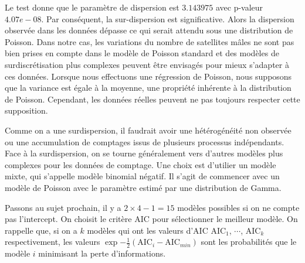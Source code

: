 \documentclass[../main.tex]{subfiles}
\begin{document}
\begin{CJK*}{UTF8}{gbsn}
Le test donne que le paramètre de dispersion est $3.143975$ avec p-valeur $4.07e-08$.
Par conséquent, la sur-dispersion est significative.
Alors la dispersion observée dans les données 
dépasse ce qui serait attendu sous une distribution de Poisson. 
Dans notre cas, les variations du nombre de satellites mâles ne sont pas 
bien prises en compte dans le modèle de Poisson standard et 
des modèles de surdiscrétisation plus complexes peuvent être envisagés pour mieux s'adapter à ces données.
Lorsque nous effectuons une régression de Poisson, nous supposons que la variance est égale à la moyenne, 
une propriété inhérente à la distribution de Poisson. 
Cependant, les données réelles peuvent ne pas toujours respecter cette supposition. 

Comme on a une surdispersion, il faudrait avoir 
une hétérogénéité non observée ou une accumulation de comptages issus de plusieurs processus indépendants.
Face à la surdispersion, 
on se tourne généralement vers d'autres modèles plus complexes pour les données de comptage. 
Une choix est d'utilier un modèle mixte, qui s'appelle modèle binomial négatif. 
Il s'agit de commencer avec un modèle de Poisson
avec le paramètre estimé par une distribution de Gamma.

Passons au sujet prochain, il y a $2 \times 4-1=15$ modèles possibles si on ne compte pas l'intercept.
On choisit le critère AIC pour sélectionner le meilleur modèle.
On rappelle que, si on a $k$ modèles qui ont les valeurs d'AIC $\text{AIC}_1$, $\cdots$, $\text{AIC}_k$ respectivement,
les valeurs $\exp{-\frac{1}{2}(\text{AIC}_i - \text{AIC}_{min})}$ sont les probabilités que le modèle $i$
minimisant la perte d'informations.


\end{CJK*}
\end{document}
